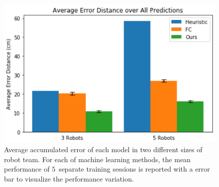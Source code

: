 \documentclass[letterpaper, 10 pt, conference]{ieeeconf}  %
\begin{document}
	
	

	\begin{figure}[t]
	\centering
	\includegraphics[width=1.\columnwidth]{fig_macro_eval}
	\caption{Average accumulated error of each model in two different sizes of robot team. 
		For each of machine learning methods, the mean performance of $5$~separate training 
		sessions is reported with a error bar to visualize the performance variation. 
	}
	\label{fig:macro_eval}
	\end{figure}
\end{document}
